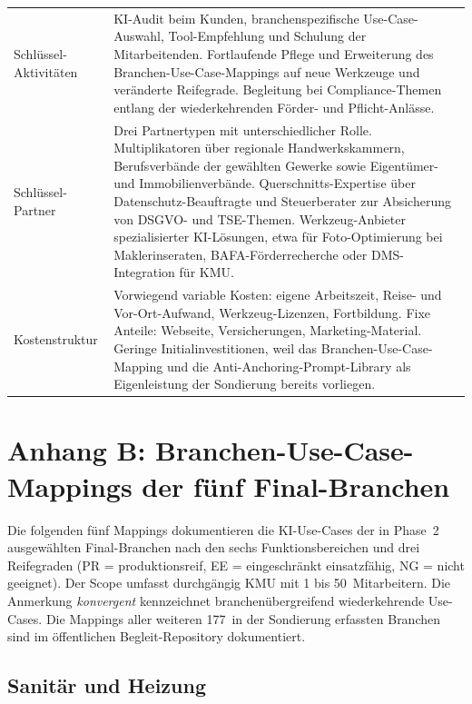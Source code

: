 \documentclass[a4paper,11pt]{article}
\begin{document}
\begin{table}[H]
\begin{tabular}{p{3.5cm}p{11cm}}
Schlüssel-Aktivitäten & KI-Audit beim Kunden, branchen\-spezifische Use-Case-Auswahl, Tool-Empfehlung und Schulung der Mitarbeitenden. Fortlaufende Pflege und Erweiterung des Branchen-Use-Case-Mappings auf neue Werkzeuge und veränderte Reifegrade. Begleitung bei Compliance-Themen entlang der wiederkehrenden Förder- und Pflicht-Anlässe. \\
Schlüssel-Partner & Drei Partner\-typen mit unterschiedlicher Rolle. Multiplikatoren über regionale Handwerks\-kammern, Berufs\-verbände der gewählten Gewerke sowie Eigentümer- und Immobilien\-verbände. Querschnitts-Expertise über Datenschutz-Beauftragte und Steuer\-berater zur Absicherung von DSGVO- und TSE-Themen. Werkzeug-Anbieter spezialisierter KI-Lösungen, etwa für Foto-Optimierung bei Makler\-inseraten, BAFA-Förder\-recherche oder DMS-Integration für KMU. \\
Kostenstruktur & Vorwiegend variable Kosten: eigene Arbeitszeit, Reise- und Vor-Ort-Aufwand, Werkzeug-Lizenzen, Fortbildung. Fixe Anteile: Webseite, Versicherungen, Marketing-Material. Geringe Initial\-investitionen, weil das Branchen-Use-Case-Mapping und die Anti-Anchoring-Prompt-Library als Eigen\-leistung der Sondierung bereits vorliegen. \\
\bottomrule
\end{tabular}
\end{table}

\newpage

\section*{Anhang B: Branchen-Use-Case-Mappings der fünf Final-Branchen}

Die folgenden fünf Mappings dokumentieren die KI-Use-Cases der in
Phase~2 ausgewählten Final-Branchen nach den sechs Funktionsbereichen
und drei Reifegraden (PR = produktionsreif, EE = eingeschränkt
einsatzfähig, NG = nicht geeignet). Der Scope umfasst durchgängig KMU
mit 1 bis 50~Mitarbeitern. Die Anmerkung \emph{konvergent}
kennzeichnet branchenübergreifend wiederkehrende Use-Cases. Die
Mappings aller weiteren 177~in der Sondierung erfassten Branchen sind
im öffentlichen Begleit-Repository dokumentiert.

\subsection*{Sanitär und Heizung}
\end{document}
